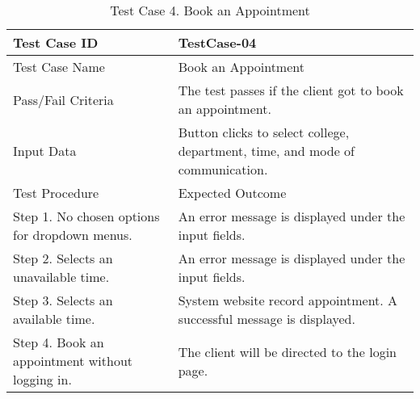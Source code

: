 \newpage
\begin{table}[h!]   %
\centering
\caption{Test Case 4. Book an Appointment} \vspace{0.25em}
\begin{tabular}{|p{2in}|p{4in}|} \hline
\centering 
Test Case ID & TestCase-04 \\ \hline
Test Case Name       &   Book an Appointment    \\ \hline
Pass/Fail Criteria       &   The test passes if the client got to book an appointment.    \\ \hline
Input Data  &  Button clicks to select college, department, time, and mode of communication.   \\ \hline
Test Procedure   & Expected Outcome  \\ \hline
Step 1. No chosen options for dropdown menus.        &    An error message is displayed under the input fields.     \\ \hline
Step 2. Selects an unavailable time.    & An error message is displayed under the input fields.    \\ \hline
Step 3. Selects an available time.  & System website record appointment. A successful message is displayed.  \\ \hline
Step 4. Book an appointment without logging in.  & The client will be directed to the login page.   \\ \hline
\end{tabular}
\label{tab:test4}
\end{table}


